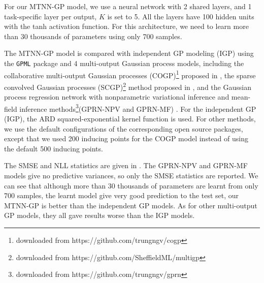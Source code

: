 For our MTNN-GP model, we use a neural network with 2 shared layers, and 1 task-specific layer per output, $K$ is set to 5. All the layers have 100 hidden units with the tanh activation function. For this architecture, we need to learn more than 30 thousands of parameters using only 700 samples.

The MTNN-GP model is compared with independent GP modeling (IGP) using the \texttt{GPML} package\cite{rasmussen2010gaussian} and 4 multi-output Gaussian process models, including the collaborative multi-output Gaussian processes (COGP)\footnote{downloaded from https://github.com/trungngv/cogp} proposed in \cite{nguyen2014collaborative}, the sparse convolved Gaussian processes (SCGP)\footnote{downloaded from https://github.com/SheffieldML/multigp} method proposed in \cite{alvarez2009sparse}, and the Gaussian process regression network with nonparametric variational inference and mean-field inference methods\footnote{downloaded from https://github.com/trungngv/gprn}(GPRN-NPV and GPRN-MF) \cite{nguyen2013efficient}. For the independent GP (IGP), the ARD squared-exponential kernel function is used. For other methods, we use the default configurations of the corresponding open source packages, except that we used 200 inducing points for the COGP model instead of using the default 500 inducing points.

The SMSE and NLL statistics are given in . The GPRN-NPV and GPRN-MF models give no predictive variances, so only the SMSE statistics are reported. We can see that although more than 30 thousands of parameters are learnt from only 700 samples, the learnt model give very good prediction to the test set, our MTNN-GP is better than the independent GP models. As for other multi-output GP models, they all gave results worse than the IGP models.

